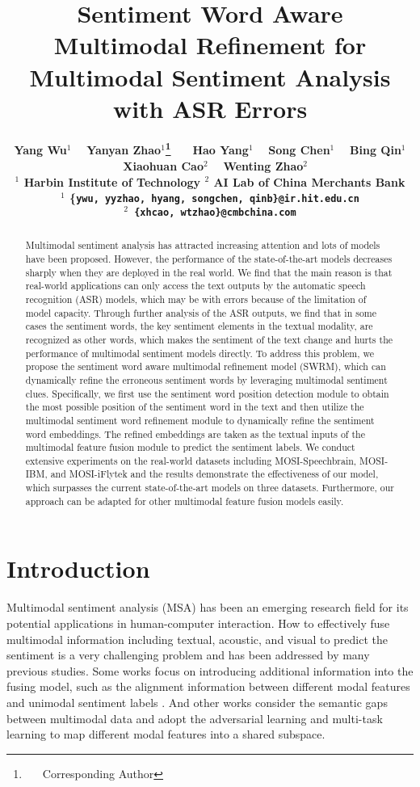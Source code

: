 \documentclass[11pt]{article}
\title{Sentiment Word Aware Multimodal Refinement for Multimodal Sentiment Analysis with ASR Errors}
\author{
	\bf Yang Wu$^1$ ~ Yanyan Zhao$^1$\thanks{~~~Corresponding Author} ~~ Hao Yang$^1$ ~ Song Chen$^1$ ~ Bing Qin$^{1}$\\ \bf ~ Xiaohuan Cao$^{2}$ ~ Wenting Zhao$^{2}$\\
	$^1$ Harbin Institute of Technology  \quad \quad $^2$ AI Lab of China Merchants Bank \\
	$^1$ \{\tt ywu, yyzhao, hyang, songchen, qinb\}@ir.hit.edu.cn \\
	$^2$ \{\tt xhcao, wtzhao\}@cmbchina.com \\
}
\begin{document}
\maketitle
\begin{abstract}
Multimodal sentiment analysis has attracted increasing attention and lots of models have been proposed. However, the performance of the state-of-the-art models decreases sharply when they are deployed in the real world. We find that the main reason is that real-world applications can only access the text outputs by the automatic speech recognition (ASR) models, which may be with errors because of the limitation of model capacity. Through further analysis of the ASR outputs, we find that in some cases the sentiment words, the key sentiment elements in the textual modality, are recognized as other words, which makes the sentiment of the text change and hurts the performance of multimodal sentiment models directly. To address this problem, we propose the sentiment word aware multimodal refinement model (SWRM), which can dynamically refine the erroneous sentiment words by leveraging multimodal sentiment clues. Specifically, we first use the sentiment word position detection module to obtain the most possible position of the sentiment word in the text and then utilize the multimodal sentiment word refinement module to dynamically refine the sentiment word embeddings. The refined embeddings are taken as the textual inputs of the multimodal feature fusion module to predict the sentiment labels. We conduct extensive experiments on the real-world datasets including MOSI-Speechbrain, MOSI-IBM, and MOSI-iFlytek and the results demonstrate the effectiveness of our model, which surpasses the current state-of-the-art models on three datasets. Furthermore, our approach can be adapted for other multimodal feature fusion models easily. 

\end{abstract}



\section{Introduction}
Multimodal sentiment analysis (MSA) has been an emerging research field for its potential applications in human-computer interaction. How to effectively fuse multimodal information including textual, acoustic, and visual to predict the sentiment is a very challenging problem and has been addressed by many previous studies. Some works focus on introducing additional information into the fusing model, such as the alignment information between different modal features \cite{wu-etal-2021-text} and unimodal sentiment labels \cite{Yu_Xu_Yuan_Wu_2021}. And other works consider the semantic gaps between multimodal data and adopt the adversarial learning \cite{Mai_Hu_Xing_2020} and multi-task learning \cite{10.1145/3394171.3413678} to map different modal features into a shared subspace. 
\end{document}
